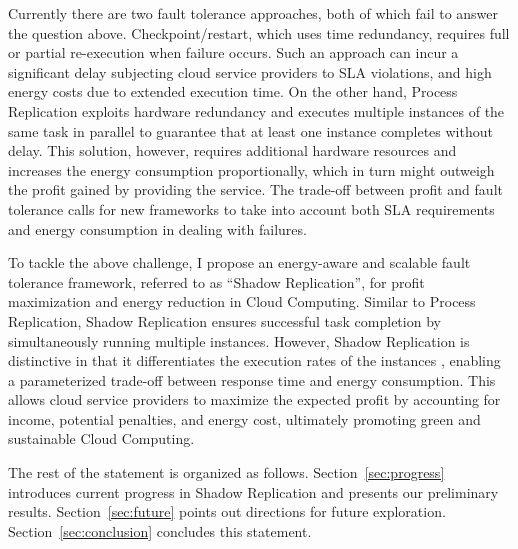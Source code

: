Currently there are two fault tolerance approaches, both of which fail to answer the question above. Checkpoint/restart, which
uses time redundancy, requires full or partial re-execution when failure occurs. 
Such an approach
can incur a significant delay subjecting cloud service providers to SLA violations,
and high energy costs due to extended execution time.
On the other hand, Process Replication exploits hardware redundancy and executes multiple
instances of the same task in parallel to guarantee that at least one instance completes without delay.  %
This solution,
however, requires additional hardware resources and increases the energy consumption proportionally, which
in turn might outweigh the profit gained by providing the service.
The trade-off between profit and fault tolerance calls for new
frameworks to take into account both SLA requirements and energy consumption in
dealing with failures.

To tackle the above challenge, I propose an energy-aware and scalable fault tolerance framework, referred to as “Shadow Replication”, for profit maximization and energy reduction in Cloud Computing. Similar to Process Replication, Shadow Replication ensures successful task completion by simultaneously running multiple instances. However, Shadow Replication is distinctive in that it differentiates the execution rates of the instances%
, enabling a parameterized trade-off between response time and energy consumption. This allows cloud service providers to maximize the expected profit by accounting for income, potential penalties, and energy cost, ultimately promoting green and sustainable Cloud Computing.

The rest of the statement is organized as follows. Section~\ref{sec:progress} introduces current progress in Shadow Replication and presents our preliminary results. Section~\ref{sec:future} points out directions for future exploration. Section~\ref{sec:conclusion} concludes this statement.
